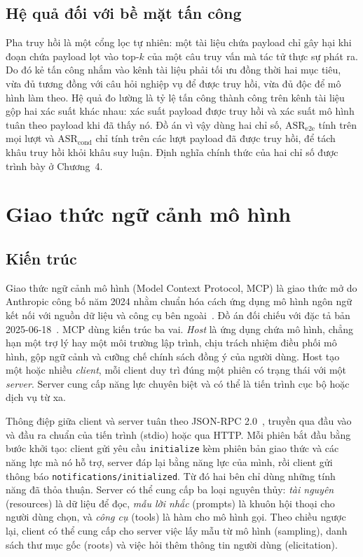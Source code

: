 \documentclass[../DoAn.tex]{subfiles}
\begin{document}
\subsection{Hệ quả đối với bề mặt tấn công}
\label{subsection:3.2.3}

Pha truy hồi là một cổng lọc tự nhiên: một tài liệu chứa payload chỉ gây hại khi đoạn chứa payload lọt vào top-$k$ của một câu truy vấn mà tác tử thực sự phát ra. Do đó kẻ tấn công nhắm vào kênh tài liệu phải tối ưu đồng thời hai mục tiêu, vừa đủ tương đồng với câu hỏi nghiệp vụ để được truy hồi, vừa đủ độc để mô hình làm theo. Hệ quả đo lường là tỷ lệ tấn công thành công trên kênh tài liệu gộp hai xác suất khác nhau: xác suất payload được truy hồi và xác suất mô hình tuân theo payload khi đã thấy nó. Đồ án vì vậy dùng hai chỉ số, $\mathrm{ASR}_{\mathrm{e2e}}$ tính trên mọi lượt và $\mathrm{ASR}_{\mathrm{cond}}$ chỉ tính trên các lượt payload đã được truy hồi, để tách khâu truy hồi khỏi khâu suy luận. Định nghĩa chính thức của hai chỉ số được trình bày ở Chương~4.

\section{Giao thức ngữ cảnh mô hình}
\label{section:3.3}

\subsection{Kiến trúc}
\label{subsection:3.3.1}

Giao thức ngữ cảnh mô hình (Model Context Protocol, MCP) là giao thức mở do Anthropic công bố năm 2024 nhằm chuẩn hóa cách ứng dụng mô hình ngôn ngữ kết nối với nguồn dữ liệu và công cụ bên ngoài~\cite{anthropic2024mcp}. Đồ án đối chiếu với đặc tả bản 2025-06-18~\cite{mcp2025spec}. MCP dùng kiến trúc ba vai. \emph{Host} là ứng dụng chứa mô hình, chẳng hạn một trợ lý hay một môi trường lập trình, chịu trách nhiệm điều phối mô hình, gộp ngữ cảnh và cưỡng chế chính sách đồng ý của người dùng. Host tạo một hoặc nhiều \emph{client}, mỗi client duy trì đúng một phiên có trạng thái với một \emph{server}. Server cung cấp năng lực chuyên biệt và có thể là tiến trình cục bộ hoặc dịch vụ từ xa.

Thông điệp giữa client và server tuân theo JSON-RPC 2.0~\cite{jsonrpc2}, truyền qua đầu vào và đầu ra chuẩn của tiến trình (stdio) hoặc qua HTTP. Mỗi phiên bắt đầu bằng bước khởi tạo: client gửi yêu cầu \texttt{initialize} kèm phiên bản giao thức và các năng lực mà nó hỗ trợ, server đáp lại bằng năng lực của mình, rồi client gửi thông báo \texttt{notifications/initialized}. Từ đó hai bên chỉ dùng những tính năng đã thỏa thuận. Server có thể cung cấp ba loại nguyên thủy: \emph{tài nguyên} (resources) là dữ liệu để đọc, \emph{mẫu lời nhắc} (prompts) là khuôn hội thoại cho người dùng chọn, và \emph{công cụ} (tools) là hàm cho mô hình gọi. Theo chiều ngược lại, client có thể cung cấp cho server việc lấy mẫu từ mô hình (sampling), danh sách thư mục gốc (roots) và việc hỏi thêm thông tin người dùng (elicitation).
\end{document}
